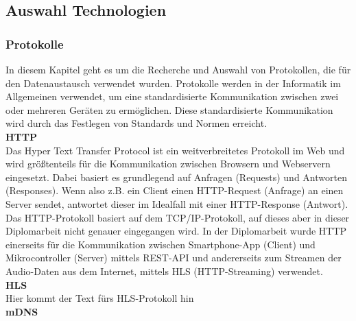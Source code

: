 \documentclass[11pt, twoside]{article}
\begin{document}
\subsection{Auswahl Technologien}
\subsubsection{Protokolle}
In diesem Kapitel geht es um die Recherche und Auswahl von Protokollen, die für den Datenaustausch verwendet wurden.
Protokolle werden in der Informatik im Allgemeinen verwendet, um eine standardisierte Kommunikation zwischen zwei oder mehreren Geräten zu ermöglichen. Diese standardisierte Kommunikation wird durch das Festlegen von Standards und Normen erreicht. \parencite[vgl.][]{noauthor_urlpi16_nodate}
\newline \\
\textbf{HTTP} \\
Das \glqq Hyper Text Transfer Protocol \grqq{} ist ein weitverbreitetes Protokoll im Web und wird größtenteils für die Kommunikation zwischen Browsern und Webservern eingesetzt. Dabei basiert es grundlegend auf Anfragen (Requests) und Antworten (Responses). Wenn also z.B. ein Client einen HTTP-Request (Anfrage) an einen Server sendet, antwortet dieser im Idealfall mit einer HTTP-Response (Antwort). Das HTTP-Protokoll basiert auf dem TCP/IP-Protokoll, auf dieses aber in dieser Diplomarbeit nicht genauer eingegangen wird. In der Diplomarbeit wurde HTTP einerseits für die Kommunikation zwischen Smartphone-App (Client) und Mikrocontroller (Server) mittels REST-API und andererseits zum Streamen der Audio-Daten aus dem Internet, mittels HLS (HTTP-Streaming) verwendet. \parencite[vgl.][]{noauthor_urlpi01_2020}
\newline \\
\textbf{HLS} \\
Hier kommt der Text fürs HLS-Protokoll hin
\newline \\
\textbf{mDNS} \\
\end{document}
